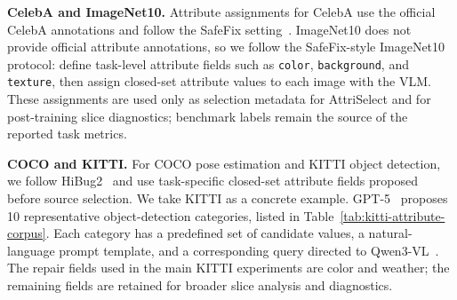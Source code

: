 \documentclass{article}
\newcommand{\model}{AttriSelect\xspace}
\begin{document}
\noindent\textbf{CelebA and ImageNet10.}
Attribute assignments for CelebA use the official CelebA annotations and follow the SafeFix setting~\citep{xu2025safefix}. ImageNet10 does not provide official attribute annotations, so we follow the SafeFix-style ImageNet10 protocol: define task-level attribute fields such as \texttt{color}, \texttt{background}, and \texttt{texture}, then assign closed-set attribute values to each image with the VLM. These assignments are used only as selection metadata for \model and for post-training slice diagnostics; benchmark labels remain the source of the reported task metrics.

\noindent\textbf{COCO and KITTI.}
For COCO pose estimation and KITTI object detection, we follow HiBug2~\citep{chen2025hibug2} and use task-specific closed-set attribute fields proposed before source selection. We take KITTI as a concrete example. GPT-5~\citep{openai2025gpt5} proposes 10 representative object-detection categories, listed in Table~\ref{tab:kitti-attribute-corpus}. Each category has a predefined set of candidate values, a natural-language prompt template, and a corresponding query directed to Qwen3-VL~\citep{bai2025qwen3vl}. The repair fields used in the main KITTI experiments are color and weather; the remaining fields are retained for broader slice analysis and diagnostics.
\end{document}
